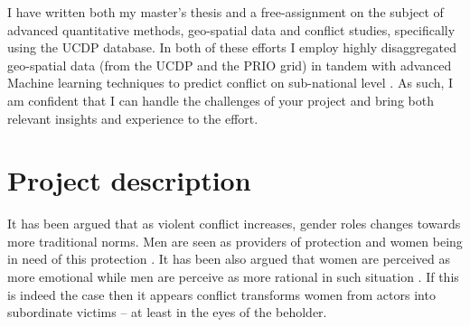 \documentclass[a4paper]{article}
\begin{document}
I have written both my master's thesis \citep{SPECIALE} and a free-assignment \citep{Maase} on the subject of advanced quantitative methods, geo-spatial data and conflict studies, specifically using the UCDP database. In both of these efforts I employ highly disaggregated geo-spatial data (from the UCDP and the PRIO grid) in tandem with advanced Machine learning techniques to predict conflict on sub-national level \cite{Maase, SPECIALE}. As such, I am confident that I can handle the challenges of your project and bring both relevant insights and experience to the effort.\par


\section{Project description}




It has been argued that as violent conflict increases, gender roles changes towards more traditional norms. Men are seen as providers of protection and women being in need of this protection \citep{elshtain1995women, carpenter2003women}. It has been also argued that women are perceived as more emotional while men are perceive as more rational in such situation \citep{elshtain1993public}. If this is indeed the case then it appears conflict transforms women from actors into subordinate victims -- at least in the eyes of the beholder.\par 
\end{document}

